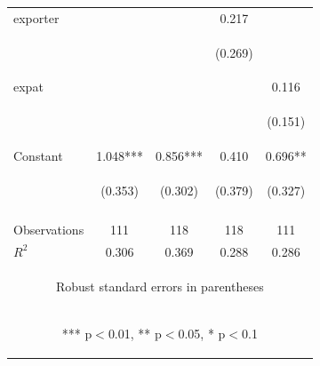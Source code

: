 \begin{center}
\begin{tabular}{lcccc}
exporter &  &  & 0.217 &  \\
\vspace{4pt} & \begin{footnotesize}\end{footnotesize} & \begin{footnotesize}\end{footnotesize} & \begin{footnotesize}(0.269)\end{footnotesize} & \begin{footnotesize}\end{footnotesize} \\
expat &  &  &  & 0.116 \\
\vspace{4pt} & \begin{footnotesize}\end{footnotesize} & \begin{footnotesize}\end{footnotesize} & \begin{footnotesize}\end{footnotesize} & \begin{footnotesize}(0.151)\end{footnotesize} \\
Constant & 1.048*** & 0.856*** & 0.410 & 0.696** \\
 & \begin{footnotesize}(0.353)\end{footnotesize} & \begin{footnotesize}(0.302)\end{footnotesize} & \begin{footnotesize}(0.379)\end{footnotesize} & \begin{footnotesize}(0.327)\end{footnotesize} \\
\vspace{4pt} & \begin{footnotesize}\end{footnotesize} & \begin{footnotesize}\end{footnotesize} & \begin{footnotesize}\end{footnotesize} & \begin{footnotesize}\end{footnotesize} \\
Observations & 111 & 118 & 118 & 111 \\
 $R^2$ & 0.306 & 0.369 & 0.288 & 0.286 \\ \hline
\multicolumn{5}{c}{\begin{footnotesize} Robust standard errors in parentheses\end{footnotesize}} \\
\multicolumn{5}{c}{\begin{footnotesize} *** p$<$0.01, ** p$<$0.05, * p$<$0.1\end{footnotesize}} \\
\end{tabular}
\end{center}
